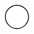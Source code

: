 \documentclass[10pt]{article}
\theoremstyle{plain}
\theoremstyle{remark}
\begin{document}
\[\begin{pgfpicture}
\begin{pgfscope}
\pgfpathcurveto{\pgfqpoint{1.945998in}{5.821551in}}{\pgfqpoint{1.925302in}{5.771586in}}{\pgfqpoint{1.925302in}{5.719495in}}%
\pgfpathcurveto{\pgfqpoint{1.925302in}{5.667405in}}{\pgfqpoint{1.945998in}{5.617440in}}{\pgfqpoint{1.982832in}{5.580607in}}%
\pgfpathcurveto{\pgfqpoint{2.019666in}{5.543773in}}{\pgfqpoint{2.069630in}{5.523077in}}{\pgfqpoint{2.121721in}{5.523077in}}%
\pgfpathclose%
\pgfusepath{stroke,fill}%
\end{pgfscope}%
\begin{pgfscope}%
\pgfsetbuttcap%
\pgfsetroundjoin%
\definecolor{currentfill}{rgb}{1.000000,1.000000,1.000000}%
\pgfsetfillcolor{currentfill}%
\pgfsetlinewidth{1.003750pt}%
\definecolor{currentstroke}{rgb}{0.000000,0.000000,0.000000}%
\pgfsetstrokecolor{currentstroke}%
\pgfsetdash{}{0pt}%
\pgfpathmoveto{\pgfqpoint{3.008454in}{3.715385in}}%
\pgfpathcurveto{\pgfqpoint{3.060545in}{3.715385in}}{\pgfqpoint{3.110509in}{3.736081in}}{\pgfqpoint{3.147343in}{3.772914in}}%
\pgfpathcurveto{\pgfqpoint{3.184177in}{3.809748in}}{\pgfqpoint{3.204873in}{3.859712in}}{\pgfqpoint{3.204873in}{3.911803in}}%
\pgfpathcurveto{\pgfqpoint{3.204873in}{3.963894in}}{\pgfqpoint{3.184177in}{4.013858in}}{\pgfqpoint{3.147343in}{4.050692in}}%
\pgfpathcurveto{\pgfqpoint{3.110509in}{4.087526in}}{\pgfqpoint{3.060545in}{4.108222in}}{\pgfqpoint{3.008454in}{4.108222in}}%
\pgfpathcurveto{\pgfqpoint{2.956363in}{4.108222in}}{\pgfqpoint{2.906399in}{4.087526in}}{\pgfqpoint{2.869565in}{4.050692in}}%
\pgfpathcurveto{\pgfqpoint{2.832731in}{4.013858in}}{\pgfqpoint{2.812036in}{3.963894in}}{\pgfqpoint{2.812036in}{3.911803in}}%
\pgfpathcurveto{\pgfqpoint{2.812036in}{3.859712in}}{\pgfqpoint{2.832731in}{3.809748in}}{\pgfqpoint{2.869565in}{3.772914in}}%
\pgfpathcurveto{\pgfqpoint{2.906399in}{3.736081in}}{\pgfqpoint{2.956363in}{3.715385in}}{\pgfqpoint{3.008454in}{3.715385in}}%
\pgfpathclose%
\pgfusepath{stroke,fill}%
\end{pgfscope}%
\begin{pgfscope}%
\pgfsetbuttcap%
\pgfsetroundjoin%
\definecolor{currentfill}{rgb}{1.000000,1.000000,1.000000}%
\pgfsetfillcolor{currentfill}%
\pgfsetlinewidth{1.003750pt}%
\definecolor{currentstroke}{rgb}{0.000000,0.000000,0.000000}%
\pgfsetstrokecolor{currentstroke}%
\pgfsetdash{}{0pt}%
\pgfpathmoveto{\pgfqpoint{0.296419in}{1.907692in}}%
\pgfpathcurveto{\pgfqpoint{0.348509in}{1.907692in}}{\pgfqpoint{0.398474in}{1.928388in}}{\pgfqpoint{0.435307in}{1.965222in}}%
\pgfpathcurveto{\pgfqpoint{0.472141in}{2.002056in}}{\pgfqpoint{0.492837in}{2.052020in}}{\pgfqpoint{0.492837in}{2.104111in}}%
\pgfpathcurveto{\pgfqpoint{0.492837in}{2.156202in}}{\pgfqpoint{0.472141in}{2.206166in}}{\pgfqpoint{0.435307in}{2.243000in}}%

\end{pgfscope}
\end{pgfpicture}\]
\end{document}
